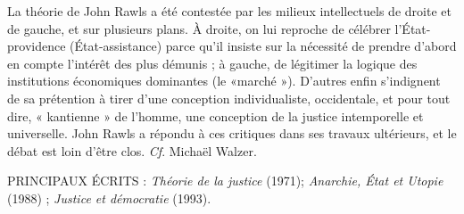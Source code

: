 La théorie de John Rawls a été contestée
par les milieux intellectuels de droite et
de gauche, et sur plusieurs plans. À
droite, on lui reproche de célébrer l’État-
providence (État-assistance) parce qu'il
insiste sur la nécessité de prendre
d'abord en compte l'intérêt des plus
démunis ; à gauche, de légitimer la
logique des institutions économiques
dominantes (le «marché »). D'autres
enfin s'indignent de sa prétention à tirer
d'une conception individualiste, occidentale, et pour tout dire, « kantienne »
de l'homme, une conception de la justice
%
 intemporelle et universelle. John
Rawls a répondu à ces critiques dans ses
travaux ultérieurs, et le débat est loin
d’être clos. {\it Cf}. Michaël Walzer.


\vspace{0.25cm}
 PRINCIPAUX ÉCRITS : {\it Théorie de la justice} (1971);
 {\it Anarchie, État et Utopie} (1988) ;
 {\it Justice et démocratie} (1993).

